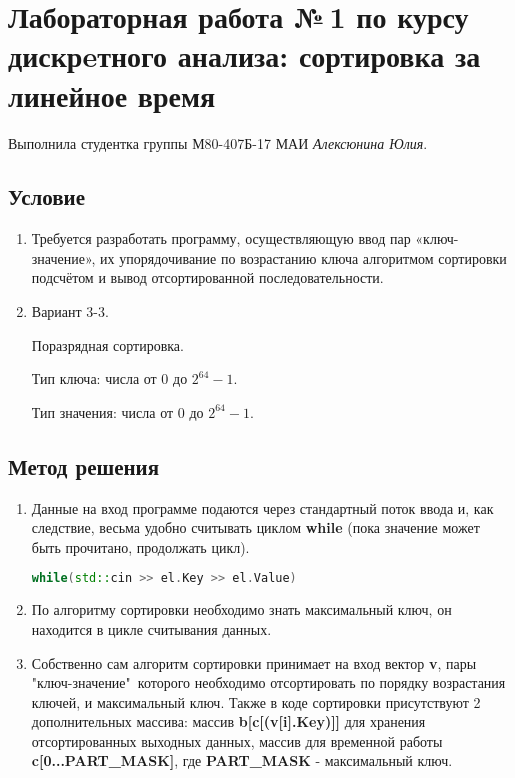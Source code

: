 \documentclass[12pt]{article}
\begin{document}
\section*{Лабораторная работа №\,1 по курсу дискрeтного анализа: сортировка за линейное время}

Выполнила студентка группы М80-407Б-17 МАИ \textit{Алексюнина Юлия}.

\subsection*{Условие}
\begin{enumerate}
\item Требуется разработать программу, осуществляющую ввод пар «ключ-значение», их упорядочивание по возрастанию ключа алгоритмом сортировки подсчётом и вывод отсортированной последовательности. 
\item Вариант 3-3.

Поразрядная сортировка.

Тип ключа: числа от 0 до $2^{64}-1$.

Тип значения: числа от 0 до $2^{64}-1$.
\end{enumerate}

\subsection*{Метод решения}

\begin{enumerate}
    \item Данные на вход программе подаются через стандартный поток ввода и, как следствие, весьма удобно считывать циклом \textbf{while} (пока значение может быть прочитано, продолжать цикл). 
    \begin{lstlisting}[language=C++]
    while(std::cin >> el.Key >> el.Value)
    \end{lstlisting}
    \item По алгоритму сортировки необходимо знать максимальный ключ, он находится в цикле считывания данных.
    \item Собственно сам алгоритм сортировки принимает на вход вектор \textbf{v}, пары "ключ-значение"\ которого необходимо отсортировать по порядку возрастания ключей, и максимальный ключ. Также в коде сортировки присутствуют 2 дополнительных массива: массив \textbf{b[c[(v[i].Key)]]} для хранения отсортированных выходных данных, массив для временной работы \textbf{c[0...PART\_MASK]}, где \textbf{PART\_MASK} - максимальный ключ.
\end{enumerate}
\end{document}
